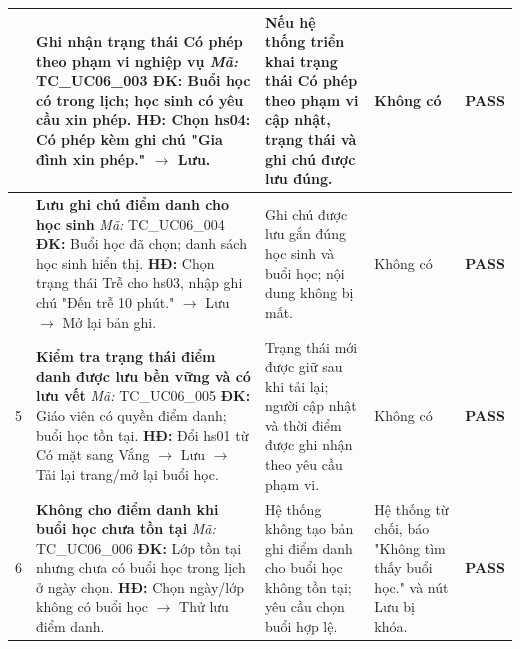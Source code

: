 \begin{longtable}{|>{\centering\arraybackslash}p{0.8cm}|>{\raggedright\arraybackslash}p{4.6cm}|>{\raggedright\arraybackslash}p{3.8cm}|>{\raggedright\arraybackslash}p{3.8cm}|>{\centering\arraybackslash}p{1.5cm}|}
3 & \textbf{Ghi nhận trạng thái Có phép theo phạm vi nghiệp vụ} \newline\newline \textit{Mã:} TC\_UC06\_003 \newline\newline \textbf{ĐK:} Buổi học có trong lịch; học sinh có yêu cầu xin phép. \newline \textbf{HĐ:} Chọn hs04: Có phép kèm ghi chú "Gia đình xin phép." $\rightarrow$ Lưu. 
& Nếu hệ thống triển khai trạng thái Có phép theo phạm vi cập nhật, trạng thái và ghi chú được lưu đúng. 
& Không có 
& \textbf{PASS} \\
\hline

4 & \textbf{Lưu ghi chú điểm danh cho học sinh} \newline\newline \textit{Mã:} TC\_UC06\_004 \newline\newline \textbf{ĐK:} Buổi học đã chọn; danh sách học sinh hiển thị. \newline \textbf{HĐ:} Chọn trạng thái Trễ cho hs03, nhập ghi chú "Đến trễ 10 phút." $\rightarrow$ Lưu $\rightarrow$ Mở lại bản ghi. 
& Ghi chú được lưu gắn đúng học sinh và buổi học; nội dung không bị mất. 
& Không có 
& \textbf{PASS} \\
\hline

5 & \textbf{Kiểm tra trạng thái điểm danh được lưu bền vững và có lưu vết} \newline\newline \textit{Mã:} TC\_UC06\_005 \newline\newline \textbf{ĐK:} Giáo viên có quyền điểm danh; buổi học tồn tại. \newline \textbf{HĐ:} Đổi hs01 từ Có mặt sang Vắng $\rightarrow$ Lưu $\rightarrow$ Tải lại trang/mở lại buổi học. 
& Trạng thái mới được giữ sau khi tải lại; người cập nhật và thời điểm được ghi nhận theo yêu cầu phạm vi. 
& Không có 
& \textbf{PASS} \\
\hline

6 & \textbf{Không cho điểm danh khi buổi học chưa tồn tại} \newline\newline \textit{Mã:} TC\_UC06\_006 \newline\newline \textbf{ĐK:} Lớp tồn tại nhưng chưa có buổi học trong lịch ở ngày chọn. \newline \textbf{HĐ:} Chọn ngày/lớp không có buổi học $\rightarrow$ Thử lưu điểm danh. 
& Hệ thống không tạo bản ghi điểm danh cho buổi học không tồn tại; yêu cầu chọn buổi hợp lệ. 
& Hệ thống từ chối, báo "Không tìm thấy buổi học." và nút Lưu bị khóa. 
& \textbf{PASS} \\
\hline


\end{longtable}
